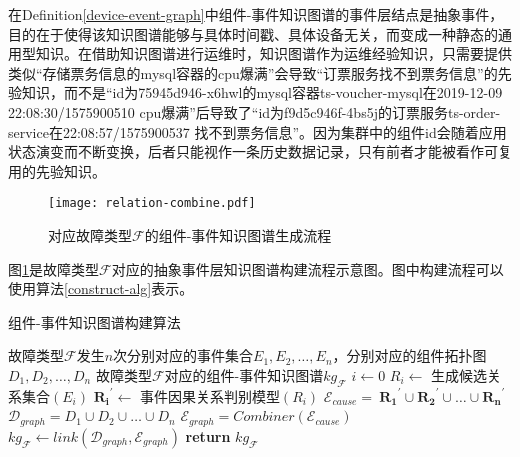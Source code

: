 在Definition\ref{device-event-graph}中组件-事件知识图谱的事件层结点是抽象事件，目的在于使得该知识图谱能够与具体时间戳、具体设备无关，而变成一种静态的通用型知识。在借助知识图谱进行运维时，知识图谱作为运维经验知识，只需要提供类似“存储票务信息的mysql容器的cpu爆满”会导致“订票服务找不到票务信息”的先验知识，而不是“id为75945d946-x6hwl的mysql容器ts-voucher-mysql在2019-12-09 22:08:30/1575900510 cpu爆满”后导致了“id为f9d5c946f-4bs5j的订票服务ts-order-service在22:08:57/1575900537 找不到票务信息”。因为集群中的组件id会随着应用状态演变而不断变换，后者只能视作一条历史数据记录，只有前者才能被看作可复用的先验知识。
\begin{figure}[htbp]
    \centering
    \texttt{[image: relation-combine.pdf]}
    \caption{对应故障类型$\mathcal{F}$的组件-事件知识图谱生成流程\label{relation-combine}}
\end{figure}

图\ref{relation-combine}是故障类型$\mathcal{F}$对应的抽象事件层知识图谱构建流程示意图。图中构建流程可以使用算法\ref{construct-alg}表示。  
\begin{algorithm}[htbp]
	\renewcommand{\algorithmicrequire}{\textbf{输入:}}
	\renewcommand{\algorithmicensure}{\textbf{输出:}}
	\caption{组件-事件知识图谱构建算法}
	\label{construct-alg}
	\begin{algorithmic}[1]
		\REQUIRE 故障类型$\mathcal{F}$发生$n$次分别对应的事件集合$E_1,E_2,…,E_n$，分别对应的组件拓扑图$D_1,D_2,…,D_n$
		\ENSURE 故障类型$\mathcal{F}$对应的组件-事件知识图谱${kg}_{\mathcal{F}}$
		\STATE $i \gets 0$
            \STATE $R_{i} \gets$ 生成候选关系集合$(E_{i})$
            \STATE ${\mathbf{R}_\mathbf{i}}^\prime \gets$ 事件因果关系判别模型$(R_{i})$
        \ENDWHILE 
        \STATE $\mathcal{E}_{cause}=\ {\mathbf{R}_\mathbf{1}}^\prime\cup{\mathbf{R}_\mathbf{2}}^\prime\cup\ldots\cup{\mathbf{R}_\mathbf{n}}^\prime$
        \STATE $\mathcal{D}_{graph}= D_1 \cup D_2\cup \ldots \cup D_n$
        \STATE $\mathcal{E}_{graph} = Combiner(\mathcal{E}_{cause})$
        \STATE ${kg}_{\mathcal{F}} \gets link(\mathcal{D}_{graph}, \mathcal{E}_{graph})$
		\STATE \textbf{return} ${kg}_{\mathcal{F}}$
	\end{algorithmic}  
\end{algorithm}

